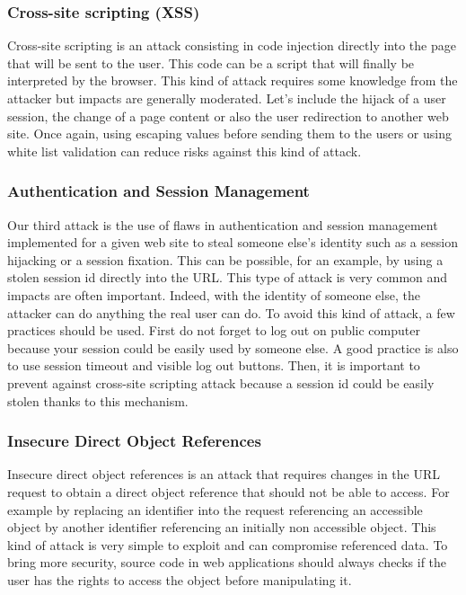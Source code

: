 \subsubsection{Cross-site scripting (XSS)}
Cross-site scripting is an attack consisting in code injection directly into
the page that will be sent to the user. This code can be a script that will
finally be interpreted by the browser. This kind of attack requires some
knowledge from the attacker but impacts are generally moderated. Let's include
the hijack of a user session, the change of a page content or also the user
redirection to another web site. Once again, using escaping values before
sending them to the users or using white list validation can reduce risks
against this kind of attack.

\subsubsection{Authentication and Session Management}
Our third attack is the use of flaws in authentication and session management
implemented for a given web site to steal someone else's identity such as a
session hijacking or a session fixation. This can be possible, for an example,
by using a stolen session id directly into the URL. This type of attack is
very common and impacts are often important. Indeed, with the identity of
someone else, the attacker can do anything the real user can do. To avoid this
kind of attack, a few practices should be used. First do not forget to log out
on public computer because your session could be easily used by someone else.
A good practice is also to use session timeout and visible log out buttons.
Then, it is important to prevent against cross-site scripting attack because a
session id could be easily stolen thanks to this mechanism.

\subsubsection{Insecure Direct Object References}
Insecure direct object references is an attack that requires changes in the
URL request to obtain a direct object reference that should not be able to
access. For example by replacing an identifier into the request referencing an
accessible object by another identifier referencing an initially non
accessible object. This kind of attack is very simple to exploit and can
compromise referenced data. To bring more security, source code in web
applications should always checks if the user has the rights to access the
object before manipulating it.

